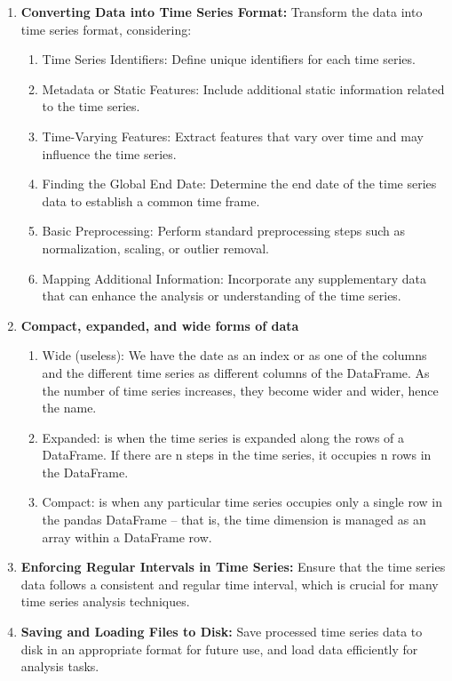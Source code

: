 \documentclass{article}
\begin{document}
\begin{enumerate}
       \item \textbf{Converting Data into Time Series Format:} Transform the data into time series format, considering:
    \begin{enumerate}
        \item  {Time Series Identifiers:} Define unique identifiers for each time series.
        \item  {Metadata or Static Features:} Include additional static information related to the time series.
        \item  {Time-Varying Features:} Extract features that vary over time and may influence the time series.
        \item  {Finding the Global End Date:} Determine the end date of the time series data to establish a common time frame.
        \item  {Basic Preprocessing:} Perform standard preprocessing steps such as normalization, scaling, or outlier removal.
        \item  {Mapping Additional Information:} Incorporate any supplementary data that can enhance the analysis or understanding of the time series.
    \end{enumerate}

    \item \textbf{Compact, expanded, and wide forms of data}
    \begin{enumerate}
        \item Wide (useless): We have the date as an index or as one of the columns and the different time series as different columns
        of the DataFrame. As the number of time series increases, they become wider and wider, hence the
        name.
        \item Expanded: is when the time series is expanded along the rows of a DataFrame. If there are
        n steps in the time series, it occupies n rows in the DataFrame.
        \item Compact: is when any particular time series occupies only a single row in the pandas
        DataFrame – that is, the time dimension is managed as an array within a DataFrame row.
    \end{enumerate}
    \item \textbf{Enforcing Regular Intervals in Time Series:} Ensure that the time series data follows a consistent and regular time interval, which is crucial for many time series analysis techniques.
        
    \item \textbf{Saving and Loading Files to Disk:} Save processed time series data to disk in an appropriate format for future use, and load data efficiently for analysis tasks.
\end{enumerate}
\end{document}
